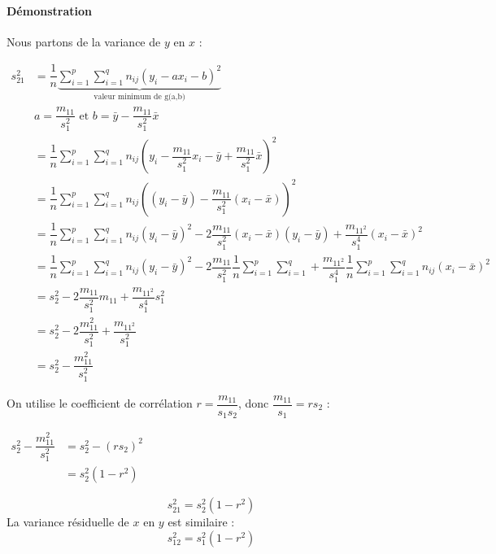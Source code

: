 \paragraph{Démonstration}
Nous partons de la variance de $y$ en $x$ :
\begin{center}
$\begin{array}{RL}
s_{21}^2 &= \dfrac{1}{n}\underbrace{\sum_{i=1}^{p}\sum_{i=1}^{q} n_{ij} \left( y_i - ax_i - b \right)^2}_{\text{valeur minimum de g(a,b)}}\\[0.5cm]
         &\boxed{a = \dfrac{m_{11}}{s_1^2}} \text{ et } \boxed{b = \bar{y} - \dfrac{m_{11}}{s_1^2}\bar{x}}\\[0.5cm]
         &= \dfrac{1}{n}\sum_{i=1}^{p}\sum_{i=1}^{q} n_{ij} \left( y_i - \dfrac{m_{11}}{s_1^2} x_i - \bar{y} + \dfrac{m_{11}}{s_1^2}\bar{x}\right)^2\\
         &= \dfrac{1}{n}\sum_{i=1}^{p}\sum_{i=1}^{q} n_{ij} \left( (y_i-\bar{y}) - \dfrac{m_{11}}{s_1^2} (x_i - \bar{x})\right)^2\\
         &= \dfrac{1}{n}\sum_{i=1}^{p}\sum_{i=1}^{q} n_{ij} (y_i-\bar{y})^2 - 2 \dfrac{m_{11}}{s_1^2} (x_i - \bar{x})(y_i-\bar{y}) + \dfrac{m_{11^2}}{s_1^4} (x_i - \bar{x})^2\\
         &= \dfrac{1}{n}\sum_{i=1}^{p}\sum_{i=1}^{q} n_{ij}(y_i-\bar{y})^2 - 2\dfrac{m_{11}}{s_1^2}\dfrac{1}{n}\sum_{i=1}^{p}\sum_{i=1}^{q} + \dfrac{m_{11^2}}{s_1^4} \dfrac{1}{n}\sum_{i=1}^{p}\sum_{i=1}^{q} n_{ij}(x_i - \bar{x})^2\\
         &= s_2^2 - 2 \dfrac{m_{11}}{s_1^2} m_{11} + \dfrac{m_{11^2}}{s_1^4} s_1^2\\
         &= s_2^2 - 2 \dfrac{m_{11}^2}{s_1^2} + \dfrac{m_{11^2}}{s_1^2}\\
         &= s_2^2 - \dfrac{m_{11}^2}{s_1^2}
\end{array}$
\end{center}
On utilise le coefficient de corrélation $r = \dfrac{m_{11}}{s_1s_2}$, donc $\dfrac{m_{11}}{s_1} = rs_2$ :
\begin{center}
$\begin{array}{RL}
s_2^2 - \dfrac{m_{11}^2}{s_1^2} &= s_2^2 - (rs_2)^2\\
                                &= s_2^2 (1-r^2)
\end{array}$
\end{center}
$$\boxed{s_{21}^2 = s_2^2 (1-r^2)}$$
La variance résiduelle de $x$ en $y$ est similaire :
$$\boxed{s_{12}^2 = s_1^2 (1-r^2)}$$
